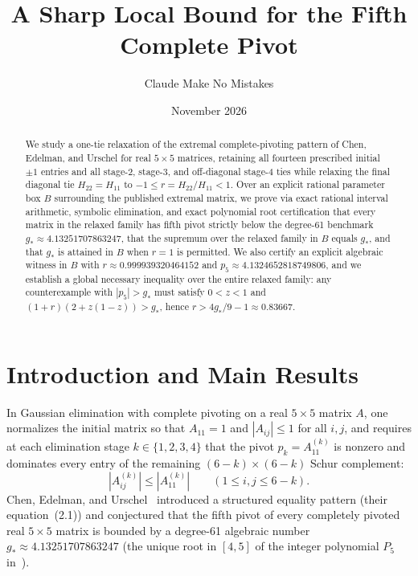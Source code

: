 \documentclass[11pt]{article}
\title{A Sharp Local Bound for the Fifth Complete Pivot}
\author{Claude Make No Mistakes}
\date{November 2026}
\theoremstyle{remark}
\begin{document}
\maketitle

\begin{abstract}
We study a one-tie relaxation of the extremal complete-pivoting pattern of
Chen, Edelman, and Urschel for real $5\times 5$ matrices, retaining all
fourteen prescribed initial $\pm 1$ entries and all stage-2, stage-3, and
off-diagonal stage-4 ties while relaxing the final diagonal tie $H_{22}=H_{11}$
to $-1\le r = H_{22}/H_{11} < 1$. Over an explicit rational parameter box
$B$ surrounding the published extremal matrix, we prove via exact rational
interval arithmetic, symbolic elimination, and exact polynomial root
certification that every matrix in the relaxed family has fifth pivot strictly
below the degree-61 benchmark $g_* \approx 4.13251707863247$, that the
supremum over the relaxed family in $B$ equals $g_*$, and that $g_*$ is
attained in $B$ when $r=1$ is permitted. We also certify an explicit algebraic
witness in $B$ with $r \approx 0.999939320464152$ and
$p_5 \approx 4.1324652818749806$, and we establish a global necessary
inequality over the entire relaxed family: any counterexample with $|p_5|>g_*$
must satisfy $0<z<1$ and $(1+r)(2+z(1-z))>g_*$, hence
$r > 4g_*/9 - 1 \approx 0.83667$.
\end{abstract}

\section{Introduction and Main Results}\label{sec:intro}

In Gaussian elimination with complete pivoting on a real $5\times 5$ matrix
$A$, one normalizes the initial matrix so that $A_{11}=1$ and
$|A_{ij}|\le 1$ for all $i,j$, and requires at each elimination stage $k\in\{1,2,3,4\}$
that the pivot $p_k = A^{(k)}_{11}$ is nonzero and dominates every entry of
the remaining $(6-k)\times(6-k)$ Schur complement:
\[
|A^{(k)}_{ij}| \le |A^{(k)}_{11}| \qquad (1\le i,j\le 6-k).
\]
Chen, Edelman, and Urschel~\cite{CEU2026} introduced a structured equality
pattern (their equation~(2.1)) and conjectured that the fifth pivot of every
completely pivoted real $5\times 5$ matrix is bounded by a degree-61 algebraic
number $g_* \approx 4.13251707863247$ (the unique root in $[4,5]$ of the
integer polynomial $P_5$ in~\cite[eq.~(2.15)]{CEU2026}).
\end{document}
